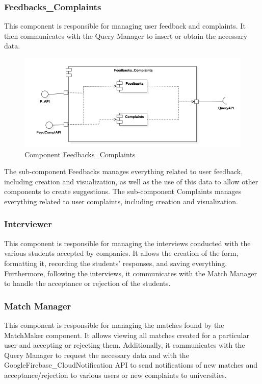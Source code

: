 \documentclass{article}
\begin{document}
\subsubsection{Feedbacks\_Complaints}
This component is responsible for managing user feedback and complaints. It then communicates with the Query Manager to insert or obtain the necessary data. 

\begin{figure}[H]
    \centering
    \includegraphics[width=1\linewidth]{FeedComplComponent.png}
    \caption{Component Feedbacks\_Complaints}
    \label{fig:enter-label}
\end{figure}

The sub-component Feedbacks manages everything related to user feedback, including creation and visualization, as well as the use of this data to allow other components to create suggestions. The sub-component Complaints manages everything related to user complaints, including creation and visualization. 

\subsubsection{Interviewer}
This component is responsible for managing the interviews conducted with the various students accepted by companies. It allows the creation of the form, formatting it, recording the students' responses, and saving everything. Furthermore, following the interviews, it communicates with the Match Manager to handle the acceptance or rejection of the students. 

\subsubsection{Match Manager}
This component is responsible for managing the matches found by the MatchMaker component. It allows viewing all matches created for a particular user and accepting or rejecting them. Additionally, it communicates with the Query Manager to request the necessary data and with the GoogleFirebase\_CloudNotification API to send notifications of new matches and acceptance/rejection to various users or new complaints to universities. 
\end{document}
